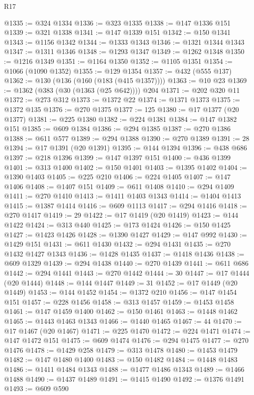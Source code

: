 \begin{lexlean}{R17}
\begin{coremodule}
@1335 := @324 @1334
@1336 := @323 @1335
@1338 := @147 @1336 @151
@1339 := @321 @1338
@1341 := @147 @1339 @151
@1342 := @150 @1341
@1343 := @1156 @1342
@1344 := @1333 @1343
@1346 := @1321 @1344 @1343
@1347 := @1311 @1346
@1348 := @1293 @1347
@1349 := @1262 @1348
@1350 := @1216 @1349
@1351 := @1164 @1350
@1352 := @1105 @1351
@1354 := @1066 (@1090 @1352)
@1355 := @129 @1354
@1357 := @432 (@555 @137)
@1362 := @130 (@136 (@160 (@183 (@415 @1357))))
@1363 := @10 @23
@1369 := @1362 (@383 (@30 (@1363 (@25 @642)))) @204
@1371 := @202 @320 @11
@1372 := @273 @312
@1373 := @1372 @22
@1374 := @1371 @1373
@1375 := @1372 @135
@1376 := @270 @1375
@1377 := 125
@1380 := @17 @1377 (@20 @1377)
@1381 := @225 @1380
@1382 := @224 @1381
@1384 := @147 @1382 @151
@1385 := @609 @1384
@1386 := @294 @1385
@1387 := @270 @1386
@1388 := @611 @577
@1389 := @294 @1388
@1390 := @270 @1389
@1391 := 28
@1394 := @17 @1391 (@20 @1391)
@1395 := @144 @1394
@1396 := @438 @686
@1397 := @218 @1396
@1399 := @147 @1397 @151
@1400 := @436 @1399
@1401 := @313 @1400
@1402 := @150 @1401
@1403 := @1395 @1402
@1404 := @1390 @1403
@1405 := @225 @210
@1406 := @224 @1405
@1407 := @147 @1406
@1408 := @1407 @151
@1409 := @611 @1408
@1410 := @294 @1409
@1411 := @270 @1410
@1413 := @1411 @1403 @1343
@1414 := @1404 @1413
@1415 := @1387 @1414
@1416 := @609 @1113
@1417 := @294 @1416
@1418 := @270 @1417
@1419 := 29
@1422 := @17 @1419 (@20 @1419)
@1423 := @144 @1422
@1424 := @313 @440
@1425 := @173 @1424
@1426 := @150 @1425
@1427 := @1423 @1426
@1428 := @1390 @1427
@1429 := @147 @992
@1430 := @1429 @151
@1431 := @611 @1430
@1432 := @294 @1431
@1435 := @270 @1432 @1427 @1343
@1436 := @1428 @1435
@1437 := @1418 @1436
@1438 := @609 @1329
@1439 := @294 @1438
@1440 := @270 @1439
@1441 := @611 @686
@1442 := @294 @1441
@1443 := @270 @1442
@1444 := 30
@1447 := @17 @1444 (@20 @1444)
@1448 := @144 @1447
@1449 := 31
@1452 := @17 @1449 (@20 @1449)
@1453 := @144 @1452
@1454 := @1372 @210
@1456 := @147 @1454 @151
@1457 := @228 @1456
@1458 := @313 @1457
@1459 := @1453 @1458
@1461 := @147 @1459 @1400
@1462 := @150 @1461
@1463 := @1448 @1462
@1465 := @1443 @1463 @1343
@1466 := @1440 @1465
@1467 := 44
@1470 := @17 @1467 (@20 @1467)
@1471 := @225 @1470
@1472 := @224 @1471
@1474 := @147 @1472 @151
@1475 := @609 @1474
@1476 := @294 @1475
@1477 := @270 @1476
@1478 := @1429 @258
@1479 := @313 @1478
@1480 := @1453 @1479
@1482 := @147 @1480 @1400
@1483 := @150 @1482
@1484 := @1448 @1483
@1486 := @1411 @1484 @1343
@1488 := @1477 @1486 @1343
@1489 := @1466 @1488
@1490 := @1437 @1489
@1491 := @1415 @1490
@1492 := @1376 @1491
@1493 := @609 @590

\end{coremodule}
\end{lexlean}
